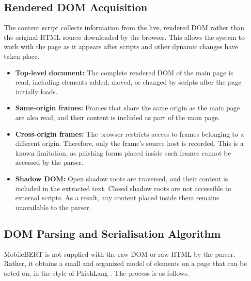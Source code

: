 \documentclass{FastFyp}
\begin{document}
\subsection{Rendered DOM Acquisition}
\label{sec:dom-acquisition}

The content script collects information from the live, rendered DOM rather than the original HTML source downloaded by the browser. This allows the system to work with the page as it appears after scripts and other dynamic changes have taken place.

\begin{itemize}
    \item \textbf{Top-level document:} The complete rendered DOM of the main page is read, including elements added, moved, or changed by scripts after the page initially loads.

    \item \textbf{Same-origin frames:} Frames that share the same origin as the main page are also read, and their content is included as part of the main page.

    \item \textbf{Cross-origin frames:} The browser restricts access to frames belonging to a different origin. Therefore, only the frame's source host is recorded. This is a known limitation, as phishing forms placed inside such frames cannot be accessed by the parser.

    \item \textbf{Shadow DOM:} Open shadow roots are traversed, and their content is included in the extracted text. Closed shadow roots are not accessible to external scripts. As a result, any content placed inside them remains unavailable to the parser.
\end{itemize}

\subsection{DOM Parsing and Serialisation Algorithm}
\label{sec:dom-parsing}
MobileBERT is not supplied with the raw DOM or raw HTML by the parser. Rather, it obtains a small and organized model of elements on a page that can be acted on, in the style of PhishLang \cite{phishlang2026}. The process is as follows.
\end{document}
